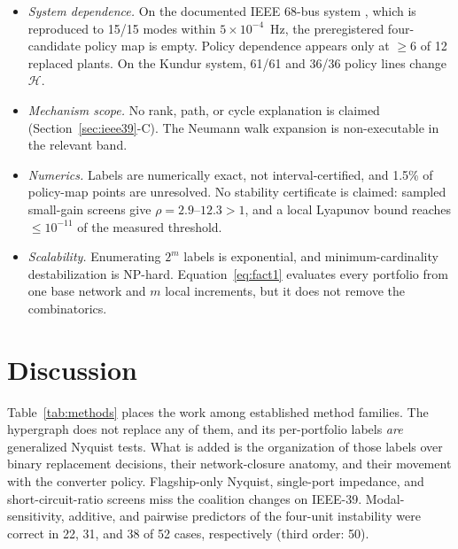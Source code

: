 \documentclass[journal]{IEEEtran}
\theoremstyle{definition}
\theoremstyle{remark}
\newcommand{\Hy}{\mathcal{H}}
\begin{document}
\begin{itemize}
correspond to the stability-limiting eigenmode (in 10 of 26 qualification
models the rightmost in-band mode carried a minority of the channel energy).
\item \emph{System dependence.} On the documented IEEE 68-bus system
\cite{canizares2015benchmark}, which is reproduced to 15/15 modes within
$5\times10^{-4}$~Hz, the preregistered four-candidate policy map is empty.
Policy dependence appears only at $\ge6$ of 12 replaced plants. On the Kundur
system, 61/61 and 36/36 policy lines change $\Hy$.
\item \emph{Mechanism scope.} No rank, path, or cycle explanation is claimed
(Section~\ref{sec:ieee39}-C). The Neumann walk expansion is non-executable in
the relevant band.
\item \emph{Numerics.} Labels are numerically exact, not interval-certified,
and 1.5\% of policy-map points are unresolved. No stability certificate is
claimed: sampled small-gain screens give $\rho=2.9$--$12.3>1$, and a local
Lyapunov bound reaches $\le10^{-11}$ of the measured threshold.
\item \emph{Scalability.} Enumerating $2^m$ labels is exponential, and
minimum-cardinality destabilization is NP-hard. Equation~\eqref{eq:fact1}
evaluates every portfolio from one base network and $m$ local increments, but
it does not remove the combinatorics.
\end{itemize}

\section{Discussion}\label{sec:discussion}
Table~\ref{tab:methods} places the work among established method families.
The hypergraph does not replace any of them, and its per-portfolio labels
\emph{are} generalized Nyquist tests. What is added is the organization of those
labels over binary replacement decisions, their network-closure anatomy, and
their movement with the converter policy. Flagship-only Nyquist, single-port
impedance, and short-circuit-ratio screens miss the coalition changes on
IEEE-39. Modal-sensitivity, additive, and pairwise predictors of the four-unit
instability were correct in 22, 31, and 38 of 52 cases, respectively (third
order: 50).
\end{document}
